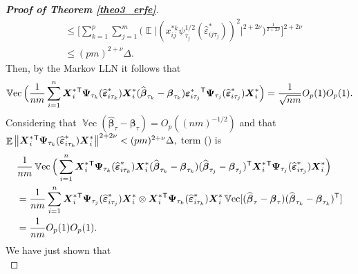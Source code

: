 \documentclass[15pt,a4paper]{article}
\DeclareMathOperator{\Vect}{\mathbb{V}\text{ec}}
\DeclareMathOperator{\E}{\mathbb{E}}
\newcommand{\norm}[1]{\left\lVert#1\right\rVert}
\newcommand{\transpose}{{}^{\text{\sffamily T}}}
\newcommand{\bigO}{O}
\begin{document}
\begin{proof}[\textbf{Proof of Theorem \ref{theo3_erfe}}]
\begin{equation*}
\begin{split}
& \leq \bigg[\sum_{k=1}^{p}\sum_{j=1}^{m}\Big(\E\lvert(x_{ij}^{*k}\psi_{\tau_j}^{1/2}(\widehat{\varepsilon}^{*}_{ij\tau_j}))^2\rvert^{2+2\nu}\Big)^{\frac{1}{2+2\nu}}\bigg]^{2+2\nu}\\
& \leq (pm)^{2+\nu}\Delta.
\end{split}
\end{equation*} 
Then, by  the Markov LLN it follows that
\begin{equation*}
    \Vect\Big(\frac{1}{nm}\sum_{i=1}^{n}\boldsymbol{X}^{*}_i\transpose \boldsymbol{\Psi}_{\tau_k}(\widehat{\boldsymbol{\varepsilon}}^{*}_{i\tau_k})\boldsymbol{X}^{*}_i (\widehat{\boldsymbol{\beta}}_{\tau_k}-\boldsymbol{\beta}_{\tau_k})\boldsymbol{\varepsilon}^{*}_{i\tau_j}\transpose\boldsymbol{\Psi}_{\tau_j}(\widehat{\boldsymbol{\varepsilon}}^{*}_{i\tau_j})
    \boldsymbol{X}^{*}_i\Big) = \frac{1}{\sqrt{nm}}\bigO_p(1)\bigO_p(1).
\end{equation*}
Considering that $\Vect(\widehat{\boldsymbol{\beta}}_{\tau}-\boldsymbol{\beta}_{\tau})=\bigO_p((nm)^{-1/2})$ and that ~~\\
$\E\norm{\boldsymbol{X}^{*}_i\transpose\boldsymbol{\Psi}_{\tau_k}(\widehat{\boldsymbol{\varepsilon}}^{*}_{i\tau_k})\boldsymbol{X}^{*}_i }^{2+2\nu} < (pm)^{2+\nu}\Delta,$ term () is
\begin{equation*}
\begin{split}
{}&\frac{1}{nm}\Vect\Big(\sum_{i=1}^{n} \boldsymbol{X}^{*}_i\transpose\boldsymbol{\Psi}_{\tau_k}(\widehat{\boldsymbol{\varepsilon}}^{*}_{i\tau_k})\boldsymbol{X}^{*}_i (\widehat{\boldsymbol{\beta}}_{\tau_{k}} - \boldsymbol{\beta}_{\tau_{k}})(\widehat{\boldsymbol{\beta}}_{\tau_{j}} - \boldsymbol{\beta}_{\tau_{j}})\transpose\boldsymbol{X}^{*}_i\transpose\boldsymbol{\Psi}_{\tau_j}(\widehat{\boldsymbol{\varepsilon}}^{*}_{i\tau_j})\boldsymbol{X}^{*}_i\Big)\\
&= \frac{1}{nm}\sum_{i=1}^{n}\boldsymbol{X}^{*}_i\transpose\boldsymbol{\Psi}_{\tau_j}(\widehat{\boldsymbol{\varepsilon}}^{*}_{i\tau_j})\boldsymbol{X}^{*}_i \otimes\boldsymbol{X}^{*}_i\transpose\boldsymbol{\Psi}_{\tau_k}(\widehat{\boldsymbol{\varepsilon}}^{*}_{i\tau_k})\boldsymbol{X}^{*}_i 
\Vect[(\widehat{\boldsymbol{\beta}}_{\tau}-\boldsymbol{\beta}_{\tau})(\widehat{\boldsymbol{\beta}}_{\tau_{k}} - \boldsymbol{\beta}_{\tau_{k}})\transpose]\\
&= \frac{1}{nm}\bigO_p(1)\bigO_p(1).
\end{split}
\end{equation*}
We have just shown that 
\begin{equation*}

\end{equation*}
\end{proof}
\end{document}
